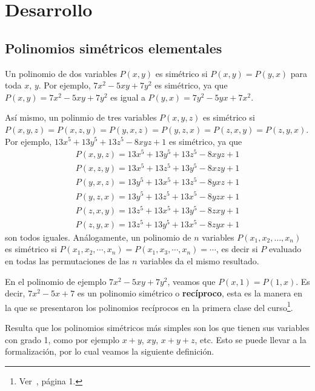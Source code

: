 \section{Desarrollo}

\subsection{Polinomios simétricos elementales}

Un polinomio de dos variables $P(x, y)$ es simétrico si $P(x, y) = P(y, x)$ para toda $x$, $y$.
Por ejemplo, $7x^2 - 5xy + 7y^2$ es simétrico, ya que $P(x, y) = 7x^2 - 5xy + 7y^2$ es igual a $P(y, x) = 7y^2 - 5yx + 7x^2$.

Así mismo, un polinmio de tres variables $P(x, y, z)$ es simétrico si $P(x, y, z) = P(x, z, y) = P(y, x, z) = P(y, z, x) = P(z, x, y) = P(z, y, x)$.
Por ejemplo, $13x^5 + 13y^5 + 13z^5 - 8xyz + 1$ es simétrico, ya que
\begin{gather*}
    P(x, y, z) = 13x^5 + 13y^5 + 13z^5 - 8xyz + 1\\
    P(x, z, y) = 13x^5 + 13z^5 + 13y^5 - 8xzy + 1\\
    P(y, x, z) = 13y^5 + 13x^5 + 13z^5 - 8yxz + 1\\
    P(y, z, x) = 13y^5 + 13z^5 + 13x^5 - 8yzx + 1\\
    P(z, x, y) = 13z^5 + 13x^5 + 13y^5 - 8zxy + 1\\
    P(z, y, x) = 13z^5 + 13y^5 + 13x^5 - 8zyx + 1
\end{gather*}
son todos iguales.
Análogamente, un polinomio de $n$ variables $P(x_1, x_2, \dots, x_n)$ es simétrico si $P(x_1, x_2, \cdots, x_n) = P(x_1, x_3, \cdots, x_n) = \cdots$, es decir si $P$ evaluado en todas las permutaciones de las $n$ variables da el mismo resultado.

\begin{remark}
    En el polinomio de ejemplo $7x^2 - 5xy + 7y^2$, veamos que $P(x, 1) =  P(1, x)$.
    Es decir, $7x^2 - 5x + 7$ es un polinomio simétrico o \textbf{recíproco}, esta es la manera en la que se presentaron los polinomios recíprocos en la primera clase del curso\footnote{Ver~\cite{TD23-clase1}, página 1.}.
\end{remark}

Resulta que los polinomios simétricos más simples son los que tienen sus variables con grado 1, como por ejemplo $x + y$, $xy$, $x + y + z$, etc.
Esto se puede llevar a la formalización, por lo cual veamos la siguiente definición.

